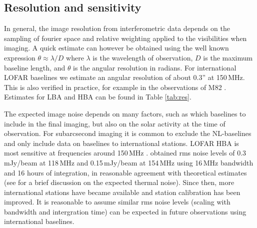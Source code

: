 \documentclass[graybox]{svmult}
\begin{document}
%

\subsection{Resolution and sensitivity}
In general, the image resolution from interferometric data depends on the
sampling of fourier space and relative weighting applied to the visibilities
when imaging.  A quick estimate can however be obtained using the well known
expression  $\theta \approx \lambda / D$
where $\lambda$ is the wavelength of observation, $D$ is the maximum baseline
length, and $\theta$ is the angular resolution in radians.  For international
LOFAR baselines we estimate an angular resolution of about 0.3'' at 150\,MHz.
This is also verified in practice, for example in the observations of M82
\cite{varenius15}. Estimates for LBA and HBA can be found in Table \ref{tab:res}.

The expected image noise depends on many factors, such as which baselines to
include in the final imaging, but also on the solar activity at the time of
observation.  For subarcsecond imaging it is common to exclude the NL-baselines
and only include data on baselines to international stations.  LOFAR HBA is
most sensitive at frequencies around 150\,MHz \citep[Fig.  22]{vanhaarlem13}.
\cite{varenius15} obtained rms noise levels of 0.3\,mJy/beam at 118\,MHz and
0.15\,mJy/beam at 154\,MHz using 16\,MHz bandwidth and 16 hours of integration,
in reasonable agreement with theoretical estimates (see \cite{varenius15} for a
brief discussion on the expected thermal noise).  Since then, more
international stations have became available and station calibration has been
improved. It is reasonable to assume similar rms noise levels
(scaling with bandwidth and intergration time) can be expected in future
observations using international baselines.
\end{document}
